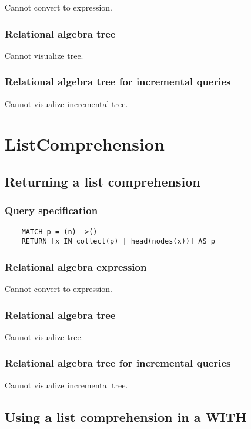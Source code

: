 	Cannot convert to expression.

	\subsubsection*{Relational algebra tree}

	Cannot visualize tree.

	\subsubsection*{Relational algebra tree for incremental queries}

	Cannot visualize incremental tree.

	\section{ListComprehension}

	\subsection{Returning a list comprehension}

	\subsubsection*{Query specification}

	\begin{lstlisting}
	MATCH p = (n)-->()
	RETURN [x IN collect(p) | head(nodes(x))] AS p
	\end{lstlisting}


	\subsubsection*{Relational algebra expression}

	Cannot convert to expression.

	\subsubsection*{Relational algebra tree}

	Cannot visualize tree.

	\subsubsection*{Relational algebra tree for incremental queries}

	Cannot visualize incremental tree.
	\subsection{Using a list comprehension in a WITH}

